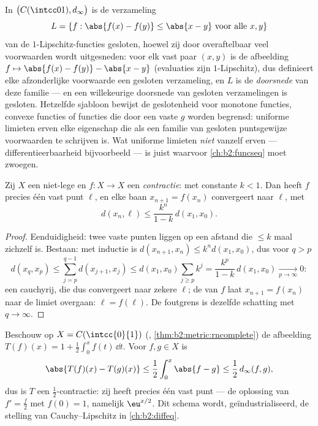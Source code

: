 \begin{example}\label{ex:b2:metric:lipclosed}
In $\bigl(C(\intcc01), d_\infty\bigr)$ is de verzameling
\[
L = \{f : \abs{f(x) - f(y)} \leq \abs{x - y}
\ \text{voor alle } x, y\}
\]
van de $1$-Lipschitz-functies gesloten, hoewel zij door
overaftelbaar veel voorwaarden wordt uitgesneden: voor elk vast
paar $(x, y)$ is de afbeelding $f \mapsto \abs{f(x) - f(y)} -
\abs{x - y}$  (evaluaties zijn $1$-Lipschitz), dus
definieert elke afzonderlijke voorwaarde een gesloten verzameling,
en $L$ is de \emph{doorsnede} van deze familie --- en een
willekeurige doorsnede van gesloten verzamelingen is gesloten.
Hetzelfde sjabloon bewijst de geslotenheid voor monotone functies,
convexe functies of functies die door een vaste $g$ worden begrensd:
uniforme limieten erven elke eigenschap die als een familie van
gesloten puntsgewijze voorwaarden te schrijven is. Wat uniforme
limieten \emph{niet} vanzelf erven --- differentieerbaarheid
bijvoorbeeld --- is juist waarvoor \cref{ch:b2:funcseq} moet
zwoegen.
\end{example}

\begin{theorem}\label{thm:b2:metric:banach}
Zij $X$ een niet-lege  en $f \colon X \to
X$ een \emph{contractie}:  met constante $k < 1$. Dan
heeft $f$ precies één vast punt $\ell$, en elke baan $x_{n+1} =
f(x_n)$ convergeert naar $\ell$, met
\[
d(x_n, \ell) \leq \frac{k^n}{1 - k}\, d(x_1, x_0) .
\]
\end{theorem}

\begin{proof}
Eenduidigheid: twee vaste punten liggen op een afstand die $\leq k$
maal zichzelf is. Bestaan: met inductie is $d(x_{n+1}, x_n) \leq
k^n d(x_1, x_0)$, dus voor $q > p$
\[
d(x_q, x_p) \leq \sum_{j=p}^{q-1} d(x_{j+1}, x_j)
\leq d(x_1, x_0) \sum_{j \geq p} k^j
= \frac{k^p}{1-k}\, d(x_1, x_0) \xrightarrow[p\to\infty]{} 0 :
\]
een cauchyrij, die dus convergeert naar zekere $\ell$; de
 van $f$ laat $x_{n+1} = f(x_n)$ naar de limiet
overgaan: $\ell = f(\ell)$. De foutgrens is dezelfde schatting met
$q \to \infty$.
\end{proof}

\begin{example}\label{ex:b2:metric:integralequation}
Beschouw op $X = C(\intcc{0}{1})$ (,
\cref{thm:b2:metric:rncomplete}) de afbeelding $T(f)(x) = 1 +
\frac12 \int_0^x f(t)\,\dd t$. Voor $f, g \in X$ is
\[
\abs{T(f)(x) - T(g)(x)} \leq \frac12 \int_0^x \abs{f - g} \leq
\frac12\, d_\infty(f, g),
\]
dus is $T$ een $\frac12$-contractie: zij heeft precies één 
vast punt --- de oplossing van $f' = \frac f2$ met $f(0) = 1$,
namelijk $\eu^{x/2}$. Dit schema wordt, geïndustrialiseerd, de
stelling van Cauchy--Lipschitz in \cref{ch:b2:diffeq}.
\end{example}

